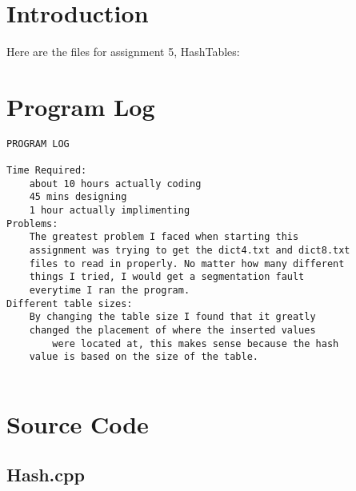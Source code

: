 \documentclass[12pt]{article}
\begin{document}
\section{Introduction}

Here are the files for assignment 5, HashTables:

\pagebreak

\section{Program Log}


\begin{verbatim}
PROGRAM LOG

Time Required:
	about 10 hours actually coding 
	45 mins designing 
	1 hour actually implimenting 
Problems:
	The greatest problem I faced when starting this 
	assignment was trying to get the dict4.txt and dict8.txt
	files to read in properly. No matter how many different 
	things I tried, I would get a segmentation fault 
	everytime I ran the program. 
Different table sizes: 
	By changing the table size I found that it greatly 
	changed the placement of where the inserted values 
        were located at, this makes sense because the hash 
	value is based on the size of the table.


\end{verbatim}

\pagebreak

\section{Source Code}


\subsection{Hash.cpp}
\end{document}
